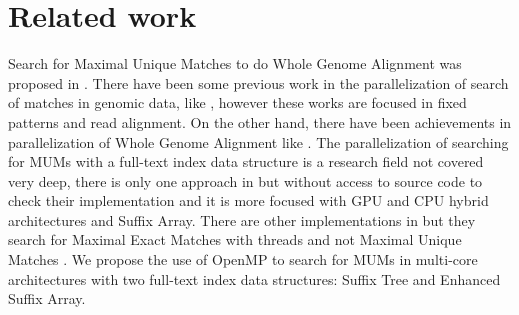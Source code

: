\documentclass[runningheads,a4paper]{llncs}
\begin{document}
\section{Related work}
Search for Maximal Unique Matches to do Whole Genome Alignment was proposed in \cite{Delcher1999}. There have been some previous work in the parallelization of search of matches in genomic data, like \cite{OguzhanKulekci2011,Mongelli,Kouzinopoulos2005}, however these works are focused in fixed patterns and read alignment. On the other hand, there have been achievements in parallelization of Whole Genome Alignment like \cite{Meng2005}. The parallelization of searching for MUMs with a full-text index data structure is a research field not covered very deep, there is only one approach in \cite{Encarnac2011} but without access to source code to check their implementation and it is more focused with GPU and CPU hybrid architectures and Suffix Array. There are other implementations in \cite{Vyverman2013,OguzhanKulekci2011,Khan2009,OhlebuschGK10} but they search for Maximal Exact Matches with threads and not Maximal Unique Matches . We propose the use of OpenMP to search for MUMs in multi-core architectures with two full-text index data structures: Suffix Tree and Enhanced Suffix Array.
\end{document}
